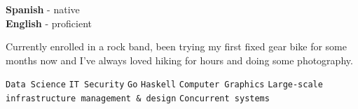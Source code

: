 \documentclass[9pt]{developercv}
\begin{document}
\begin{minipage}[t]{0.3\textwidth}
    \vspace{-\baselineskip}

    
    \textbf{Spanish} - native\\
    \textbf{English} - proficient
\end{minipage}
\hfill
\begin{minipage}[t]{0.3\textwidth}
    \vspace{-\baselineskip}
    
    
    Currently enrolled in a rock band, been trying my first fixed gear bike for
    some months now and I've always loved hiking for hours and
    doing some photography.
\end{minipage}
\hfill
\begin{minipage}[t]{0.3\textwidth}
    \vspace{-\baselineskip}


    \texttt{Data Science}\slashsep
    \texttt{IT Security}\slashsep
    \texttt{Go}\slashsep
    \texttt{Haskell}\slashsep
    \texttt{Computer Graphics}\slashsep
    \texttt{Large-scale infrastructure management \& design}\slashsep
    \texttt{Concurrent systems}
\end{minipage}

\end{document}
